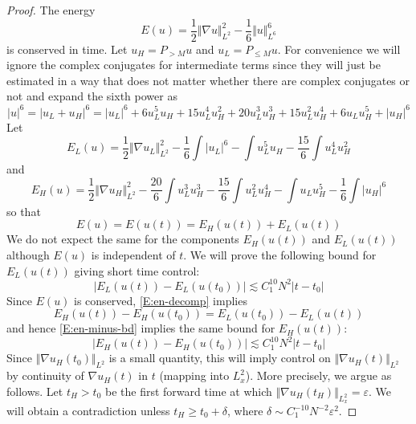 \documentclass[12pt,letterpaper,leqno]{amsart}
\theoremstyle{plain}
\numberwithin{equation}{section}
\numberwithin{theorem}{section}
\numberwithin{proposition}{section}
\numberwithin{lemma}{section}
\numberwithin{corollary}{section}
\begin{document}
\begin{proof}
The energy 
\begin{equation*}
E(u)=\frac{1}{2}\Vert \nabla u\Vert _{L^{2}}^{2}-\frac{1}{6}\Vert u\Vert
_{L^{6}}^{6}
\end{equation*}%
is conserved in time. Let $u_{H}=P_{>M}u$ and $u_{L}=P_{\leqslant M}u$. For
convenience we will ignore the complex conjugates for intermediate terms
since they will just be estimated in a way that does not matter whether
there are complex conjugates or not and expand the sixth power as 
\begin{equation*}
|u|^{6}=|u_{L}+u_{H}|^{6}=|u_{L}|^{6}+6u_{L}^{5}u_{H}+15u_{L}^{4}u_{H}^{2}+20u_{L}^{3}u_{H}^{3}+15u_{L}^{2}u_{H}^{4}+6u_{L}u_{H}^{5}+|u_{H}|^{6}
\end{equation*}%
Let 
\begin{equation}
E_{L}(u)=\frac{1}{2}\Vert \nabla u_{L}\Vert _{L^{2}}^{2}-\frac{1}{6}\int
|u_{L}|^{6}-\int u_{L}^{5}u_{H}-\frac{15}{6}\int u_{L}^{4}u_{H}^{2}
\label{E:Eminus}
\end{equation}%
and 
\begin{equation}
E_{H}(u)=\frac{1}{2}\Vert \nabla u_{H}\Vert _{L^{2}}^{2}-\frac{20}{6}\int
u_{L}^{3}u_{H}^{3}-\frac{15}{6}\int u_{L}^{2}u_{H}^{4}-\int u_{L}u_{H}^{5}-%
\frac{1}{6}\int |u_{H}|^{6}  \label{E:Eplus}
\end{equation}%
so that 
\begin{equation}
E(u)=E(u(t))=E_{H}(u(t))+E_{L}(u(t))  \label{E:en-decomp}
\end{equation}%
We do not expect the same for the components $E_{H}(u(t))$ and $E_{L}(u(t))$
although $E(u)$ is independent of $t$. We will prove the following bound for 
$E_{L}(u(t))$ giving short time control: 
\begin{equation}
\left\vert E_{L}(u(t))-E_{L}(u(t_{0}))\right\vert \lesssim
C_{1}^{10}N^{2}|t-t_{0}|  \label{E:en-minus-bd}
\end{equation}%
Since $E(u)$ is conserved, \eqref{E:en-decomp} implies 
\begin{equation*}
E_{H}(u(t))-E_{H}(u(t_{0}))=E_{L}(u(t_{0}))-E_{L}(u(t))
\end{equation*}
and hence \eqref{E:en-minus-bd} implies the same bound for $E_{H}(u(t))$: 
\begin{equation}
\left\vert E_{H}(u(t))-E_{H}(u(t_{0}))\right\vert \lesssim
C_{1}^{10}N^{2}|t-t_{0}|  \label{E:en-plus-bd}
\end{equation}%
Since $\Vert \nabla u_{H}(t_{0})\Vert _{L^{2}}$ is a small quantity, this
will imply control on $\Vert \nabla u_{H}(t)\Vert _{L^{2}}$ by continuity of 
$\nabla u_{H}(t)$ in $t$ (mapping into $L_{x}^{2}$). More precisely, we
argue as follows. Let $t_{H}>t_{0}$ be the first forward time at which $%
\Vert \nabla u_{H}(t_{H})\Vert _{L_{x}^{2}}=\varepsilon $. We will obtain a
contradiction unless $t_{H}\geqslant t_{0}+\delta $, where $\delta \sim
C_{1}^{-10}N^{-2}\varepsilon ^{2}$.


\end{proof}
\end{document}

